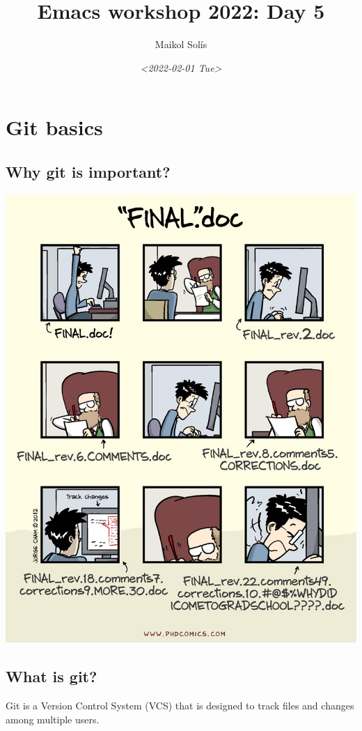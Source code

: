 \documentclass[11pt]{article}
\author{Maikol Solís}
\date{\textit{<2022-02-01 Tue>}}
\title{Emacs workshop 2022: Day 5}
\begin{document}
\section{Git basics}
\label{sec:orgef41def}

\subsection{Why git is important?}
\label{sec:org94decb8}

\begin{center}
\includegraphics[width=.9\linewidth]{./final.jpg}
\end{center}

\newpage
\subsection{What is git?}
\label{sec:orgdc7b64a}

Git is a Version Control System (VCS) that is designed to track files and changes among multiple users.
\end{document}

